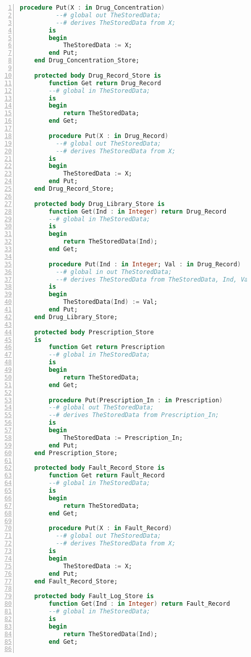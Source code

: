 \begin{lstlisting}[language=ada, gobble=0, numbers=left, caption={\lstinline{Pca_Types} package}, label={listing:pca_generated:pca_types}]
        procedure Put(X : in Drug_Concentration)
          --# global out TheStoredData;
          --# derives TheStoredData from X;
        is
        begin
            TheStoredData := X;
        end Put;
    end Drug_Concentration_Store;

    protected body Drug_Record_Store is
        function Get return Drug_Record
        --# global in TheStoredData;
        is
        begin
            return TheStoredData;
        end Get;

        procedure Put(X : in Drug_Record)
          --# global out TheStoredData;
          --# derives TheStoredData from X;
        is
        begin
            TheStoredData := X;
        end Put;
    end Drug_Record_Store;

    protected body Drug_Library_Store is
        function Get(Ind : in Integer) return Drug_Record
        --# global in TheStoredData;
        is
        begin
            return TheStoredData(Ind);
        end Get;

        procedure Put(Ind : in Integer; Val : in Drug_Record)
          --# global in out TheStoredData;
          --# derives TheStoredData from TheStoredData, Ind, Val;
        is
        begin
            TheStoredData(Ind) := Val;
        end Put;
    end Drug_Library_Store;

    protected body Prescription_Store
    is
        function Get return Prescription
        --# global in TheStoredData;
        is
        begin
            return TheStoredData;
        end Get;

        procedure Put(Prescription_In : in Prescription)
        --# global out TheStoredData;
        --# derives TheStoredData from Prescription_In;
        is
        begin
            TheStoredData := Prescription_In;
        end Put;
    end Prescription_Store;

    protected body Fault_Record_Store is
        function Get return Fault_Record
        --# global in TheStoredData;
        is
        begin
            return TheStoredData;
        end Get;

        procedure Put(X : in Fault_Record)
          --# global out TheStoredData;
          --# derives TheStoredData from X;
        is
        begin
            TheStoredData := X;
        end Put;
    end Fault_Record_Store;

    protected body Fault_Log_Store is
        function Get(Ind : in Integer) return Fault_Record
        --# global in TheStoredData;
        is
        begin
            return TheStoredData(Ind);
        end Get;


\end{lstlisting}
